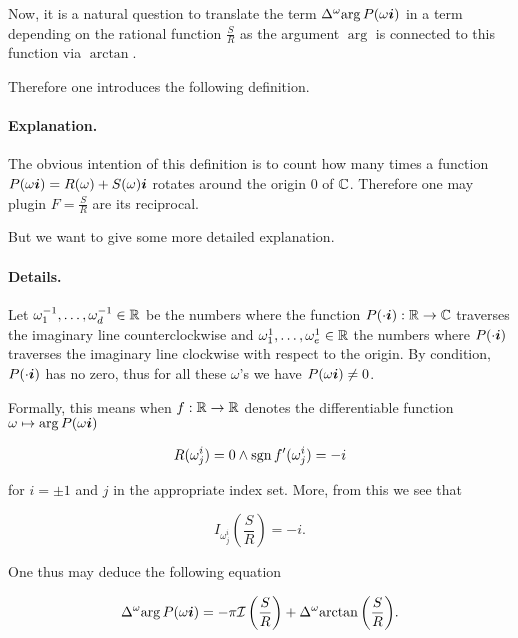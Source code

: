 \message{ !name(On The Routh-Hurwitz Theorem.tex)}\documentclass[10pt,a4paper]{article}
\begin{document}
Now, it is a natural question to translate the term $\Delta^\omega{\arg{P(\omega\boldsymbol{i})}}$ in a term depending on the rational function $\frac{S}{R}$ as the argument $\arg$ is connected to this function via $\arctan$.

Therefore one introduces the following definition. 



\paragraph{Explanation.} The obvious intention of this definition is to count how many times a function $P(\omega\boldsymbol{i})=R(\omega)+S(\omega)\boldsymbol{i}$ rotates around the origin $0$ of $\mathbb{C}$. Therefore one may plugin $F=\frac{S}{R}$ are its reciprocal.

But we want to give some more detailed explanation.

\paragraph{Details.} %
Let $\omega^{-1}_1,\ldots,\omega^{-1}_d\in\mathbb{R}$ be the numbers where the function $P(\cdot\boldsymbol{i}):\mathbb{R}\rightarrow\mathbb{C}$ traverses the imaginary line counterclockwise and $\omega^1_1,\ldots,\omega^1_e\in\mathbb{R}$ the numbers where $P(\cdot\boldsymbol{i})$ traverses the imaginary line clockwise with respect to the origin. By condition, $P(\cdot\boldsymbol{i})$ has no zero, thus for all these $\omega$'s we have $P(\omega\boldsymbol{i})\neq 0$.

Formally, this means when $f:\mathbb{R}\rightarrow\mathbb{R}$ denotes the differentiable function $\omega\mapsto\arg{P(\omega\boldsymbol{i})}$

\begin{equation}
R(\omega^i_j)=0 \wedge \operatorname{sgn}{f'(\omega^i_j)}=-i
\end{equation}

for $i=\pm 1$ and $j$ in the appropriate index set.
More, from this we see that

\begin{equation}
I_{\omega^i_j}\left(\frac{S}{R}\right)=-i\text{.}
\end{equation}

One thus may deduce the following equation

\begin{equation}
\Delta^\omega{\arg{P(\omega\boldsymbol{i})}}=-\pi\mathcal{I}\left(\frac{S}{R}\right)+\Delta^\omega{\arctan\left(\frac{S}{R}\right)}\text{.}\label{eq4}
\end{equation}
\end{document}
